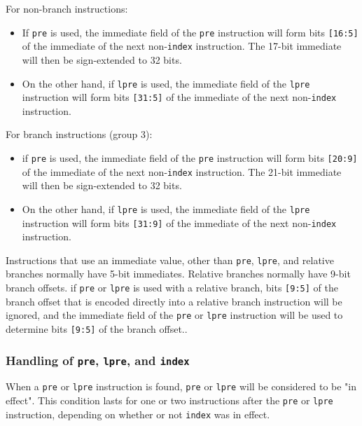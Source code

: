 \documentclass{article}
\begin{document}
	For non-branch instructions:
	\begin{itemize}
	\item If \texttt{pre} is used, the immediate field of the
	\texttt{pre} instruction will form bits \texttt{[16:5]} of the
	immediate of the next non-\texttt{index} instruction. The 17-bit
	immediate will then be sign-extended to 32 bits.

	\item On the other hand, if \texttt{lpre} is used, the immediate
	field of the \texttt{lpre} instruction will form bits
	\texttt{[31:5]} of the immediate of the next non-\texttt{index}
	instruction.
	\end{itemize}


	For branch instructions (group 3):
	\begin{itemize}
	\item if \texttt{pre} is used, the
	immediate field of the \texttt{pre} instruction will form bits
	\texttt{[20:9]} of the immediate of the next non-\texttt{index}
	instruction. The 21-bit immediate will then be sign-extended to 32
	bits.

	\item On the other hand, if \texttt{lpre} is used, the immediate
	field of the \texttt{lpre} instruction will form bits
	\texttt{[31:9]} of the immediate of the next non-\texttt{index}
	instruction.
	\end{itemize}

	Instructions that use an immediate value, other than \texttt{pre},
	\texttt{lpre}, and relative branches normally have 5-bit immediates.
	Relative branches normally have 9-bit branch offsets. if \texttt{pre}
	or \texttt{lpre} is used with a relative branch, bits \texttt{[9:5]} of
	the branch offset that is encoded directly into a relative branch
	instruction will be ignored, and the immediate field of the
	\texttt{pre} or \texttt{lpre} instruction will be used to determine
	bits \texttt{[9:5]} of the branch offset..

	\subsubsection{Handling of \texttt{pre}, \texttt{lpre}, and
	\texttt{index}}

	When a \texttt{pre} or \texttt{lpre} instruction is found, \texttt{pre}
	or \texttt{lpre} will be considered to be "in effect". This condition
	lasts for one or two instructions after the \texttt{pre} or
	\texttt{lpre} instruction, depending on whether or not \texttt{index}
	was in effect.
\end{document}
